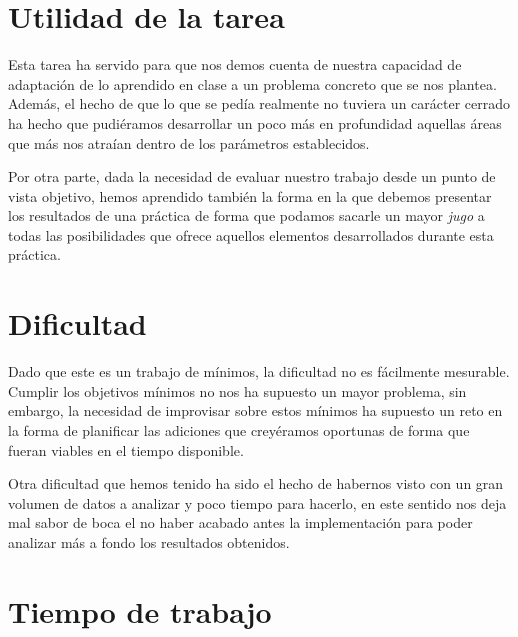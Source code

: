 \documentclass[a4paper]{report}
\begin{document}
	\section*{Utilidad de la tarea}
	Esta tarea ha servido para que nos demos cuenta de nuestra capacidad de adaptación de lo aprendido en clase a un problema concreto que se nos plantea. Además, el hecho de que lo que se pedía realmente no tuviera un carácter cerrado ha hecho que pudiéramos desarrollar un poco más en profundidad aquellas áreas que más nos atraían dentro de los parámetros establecidos.
	
	Por otra parte, dada la necesidad de evaluar nuestro trabajo desde un punto de vista objetivo, hemos aprendido también la forma en la que debemos presentar los resultados de una práctica de forma que podamos sacarle un mayor \emph{jugo} a todas las posibilidades que ofrece aquellos elementos desarrollados durante esta práctica.
	\section*{Dificultad}
	Dado que este es un trabajo de mínimos, la dificultad no es fácilmente mesurable. Cumplir los objetivos mínimos no nos ha supuesto un mayor problema, sin embargo, la necesidad de improvisar sobre estos mínimos ha supuesto un reto en la forma de planificar las adiciones que creyéramos oportunas de forma que fueran viables en el tiempo disponible.
	
	Otra dificultad que hemos tenido ha sido el hecho de habernos visto con un gran volumen de datos a analizar y poco tiempo para hacerlo, en este sentido nos deja mal sabor de boca el no haber acabado antes la implementación para poder analizar más a fondo los resultados obtenidos.
	\section*{Tiempo de trabajo}
	
\end{document}
